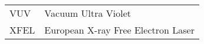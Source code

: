 \begin{tabular}{ll}
VUV     &Vacuum Ultra Violet\\
XFEL    &European X-ray Free Electron Laser
\end{tabular}
